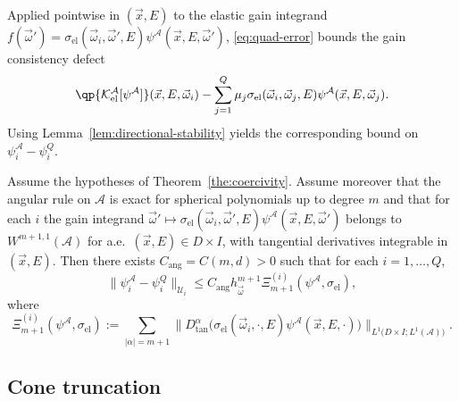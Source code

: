 \documentclass[final]{amsart}
\begin{document}
Applied pointwise in $(\vec x,E)$ to the elastic gain integrand
$f(\vec\omega')=\sigma_{\mathrm{el}}(\vec\omega_i,\vec\omega',E) 
\psi^{\mathcal A}(\vec x,E,\vec\omega')$, \eqref{eq:quad-error} bounds the
gain consistency defect
\[
  \qp{\mathcal K_{\mathrm{el}}^{\mathcal A}[\psi^{\mathcal A}]}
  (\vec x,E,\vec\omega_i)
  -
  \sum_{j=1}^Q \mu_j \sigma_{\mathrm{el}}(\vec\omega_i,\vec\omega_j,E) 
  \psi^{\mathcal A}(\vec x,E,\vec\omega_j).
\]
Using Lemma~\ref{lem:directional-stability} yields the corresponding bound
on $\psi_i^{\mathcal A}-\psi_i^Q$.

\begin{proposition}
\label{prop:quad-to-solution}
Assume the hypotheses of Theorem~\ref{the:coercivity}. Assume moreover
that the angular rule on $\mathcal A$ is exact for spherical polynomials
up to degree $m$ and that for each $i$ the gain integrand
$\vec\omega'\mapsto \sigma_{\mathrm{el}}(\vec\omega_i,\vec\omega',E) 
\psi^{\mathcal A}(\vec x,E,\vec\omega')$ belongs to $W^{m+1,1}(\mathcal A)$
for a.e.\ $(\vec x,E)\in D\times I$, with tangential derivatives
integrable in $(\vec x,E)$. Then there exists $C_{\mathrm{ang}}=C(m,d)>0$
such that for each $i=1,\dots,Q$,
\[
  \|\psi_i^{\mathcal A}-\psi_i^{Q}\|_{\mathcal U_i}
  \le
  C_{\mathrm{ang}} h_{\vec\omega}^{m+1} 
  \Xi_{m+1}^{(i)}(\psi^{\mathcal A},\sigma_{\mathrm{el}}),
\]
where
\[
  \Xi_{m+1}^{(i)}(\psi^{\mathcal A},\sigma_{\mathrm{el}})
  :=
  \sum_{|\alpha|=m+1}
  \big\|D_{\tan}^\alpha\!\big(\sigma_{\mathrm{el}}(\vec\omega_i,\cdot,E) 
  \psi^{\mathcal A}(\vec x,E,\cdot)\big)\big\|_{L^1\big(D\times I;L^1(\mathcal A)\big)}.
\]
\end{proposition}

\subsection{Cone truncation}
\label{subsec:errorcontrol-truncation}
\end{document}
